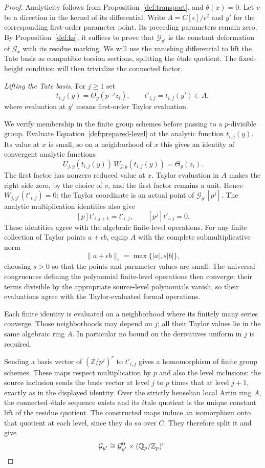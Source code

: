 \begin{proof}
Analyticity follows from Proposition~\ref{def:transport}, and
$\theta(x)=0$.  Let $v$ be a direction in the kernel of its differential.
Write $A=C[\epsilon]/\epsilon^2$ and $y'$ for the corresponding
first-order parameter point.  Its preceding parameters remain zero.
By Proposition~\ref{def:ks}, it suffices to prove that
$\mathcal G_{y'}$ is the constant deformation of $\mathcal G_x$ with
its residue marking.  We will use the vanishing differential to lift the
Tate basis as compatible torsion sections, splitting the \'etale quotient.
The fixed-height condition will then trivialize the connected factor.

\smallskip
\noindent\emph{Lifting the Tate basis.}
For $j\ge1$ set
\[
 t_{i,j}(y)=\Theta_y(p^{-j}z_i),\qquad
 t'_{i,j}=t_{i,j}(y')\in A,
\]
where evaluation at $y'$ means first-order Taylor evaluation.

We verify membership in the finite group schemes before passing to a
$p$-divisible group.  Evaluate Equation~\eqref{def:prepared-level} at the
analytic function $t_{i,j}(y)$.  Its value at $x$ is small, so on a
neighborhood of $x$ this gives an identity of convergent analytic
functions
\[
 U_{j,y}(t_{i,j}(y))\,W_{j,y}(t_{i,j}(y))
       =\Theta_y(z_i).
\]
The first factor has nonzero reduced value at $x$.  Taylor evaluation in
$A$ makes the right side zero, by the choice of $v$, and the first factor
remains a unit.  Hence $W_{j,y'}(t'_{i,j})=0$: the Taylor coordinate is an
actual point of $\mathcal G_{y'}[p^j]$.
The analytic multiplication identities also give
\[
 [p]t'_{i,j+1}=t'_{i,j},\qquad [p^j]t'_{i,j}=0.
\]
These identities agree with the algebraic finite-level operations.
For any finite collection of Taylor points $a+\epsilon b$, equip $A$
with the complete submultiplicative norm
\[
 \|a+\epsilon b\|_s=\max\{|a|,s|b|\},
\]
choosing $s>0$ so that the points and parameter values are small.
The universal congruences defining the polynomial finite-level operations
then converge; their terms divisible by the appropriate source-level
polynomials vanish, so their evaluations agree with the Taylor-evaluated
formal operations.

Each finite identity is evaluated on a neighborhood where its finitely
many series converge.  Those neighborhoods may depend on $j$; all their
Taylor values lie in the same algebraic ring $A$.  In particular no bound
on the derivatives uniform in $j$ is required.

Sending a basis vector of $(\mathbb Z/p^j)^r$ to $t'_{i,j}$ gives a homomorphism
of finite group schemes.  These maps respect multiplication by $p$ and
also the level inclusions: the source inclusion sends the basis vector
at level $j$ to $p$ times that at level $j+1$, exactly as in the displayed
identity.  Over the strictly henselian local Artin ring $A$, the
connected--\'etale sequence exists and its \'etale quotient is the
unique constant lift of the residue quotient.  The constructed maps
induce an isomorphism onto that quotient at each level, since they do so
over $C$.  They therefore split it and give
\[
 \mathcal G_{y'}\cong
       \mathcal G_{y'}^0\times(\mathbb Q_p/\mathbb Z_p)^r.
\]


\end{proof}
